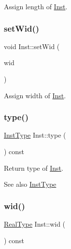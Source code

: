 Assign length of \hyperlink{classInst}{Inst}. 

\mbox{\label{classInst_a0667cb5b7b7ef52c67ce0f2514b933b0}} 
\subsubsection{\texorpdfstring{set\+Wid()}{setWid()}}
{\footnotesize\ttfamily void Inst\+::set\+Wid (\begin{DoxyParamCaption}\item[{\hyperlink{type_8h_a51898ad9e46b1265f3fab67f7d4b04a2}{Real\+Type}}]{wid }\end{DoxyParamCaption})\hspace{0.3cm}{\ttfamily [inline]}}



Assign width of \hyperlink{classInst}{Inst}. 

\mbox{\label{classInst_a7d6e3dafcbb552bf31069d80b9b87607}} 
\subsubsection{\texorpdfstring{type()}{type()}}
{\footnotesize\ttfamily \hyperlink{type_8h_a53644c687d6bc203d9d3d3ee70075f61}{Inst\+Type} Inst\+::type (\begin{DoxyParamCaption}{ }\end{DoxyParamCaption}) const\hspace{0.3cm}{\ttfamily [inline]}}



Return type of \hyperlink{classInst}{Inst}. 

\begin{DoxySeeAlso}{See also}
\hyperlink{type_8h_a53644c687d6bc203d9d3d3ee70075f61}{Inst\+Type} 
\end{DoxySeeAlso}
\mbox{\label{classInst_a18cd79f2cb3e30b1d8731381d311a919}} 
\subsubsection{\texorpdfstring{wid()}{wid()}}
{\footnotesize\ttfamily \hyperlink{type_8h_a51898ad9e46b1265f3fab67f7d4b04a2}{Real\+Type} Inst\+::wid (\begin{DoxyParamCaption}{ }\end{DoxyParamCaption}) const\hspace{0.3cm}{\ttfamily [inline]}}



